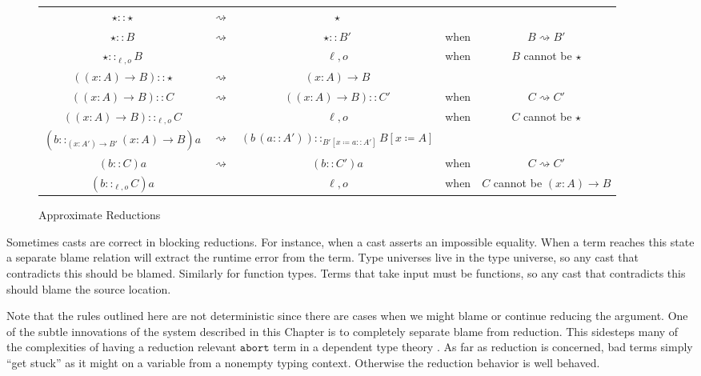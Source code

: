 \begin{sidewaysfigure}
\begin{tabular}{ccccc}
$\star::\star$ & $\rightsquigarrow$ & $\star$ &  & \tabularnewline
$\star::B$ & $\rightsquigarrow$ & $\star::B'$ & when  & $B\rightsquigarrow B'$\tabularnewline
$\star::_{\ell,o}B$ & \Blame{} & $\ell,o$ & when  & $B$ cannot be $\star$ \tabularnewline
$\left(\left(x:A\right)\rightarrow B\right)::\star$ & $\rightsquigarrow$ & $\left(x:A\right)\rightarrow B$ &  & \tabularnewline
$\left(\left(x:A\right)\rightarrow B\right)::C$ & $\rightsquigarrow$ & $\left(\left(x:A\right)\rightarrow B\right)::C'$ & when  & $C\rightsquigarrow C'$\tabularnewline
$\left(\left(x:A\right)\rightarrow B\right)::_{\ell,o}C$ & \Blame{} & $\ell,o$ & when  & $C$ cannot be $\star$ \tabularnewline
$\left(b::_{\left(x:A'\right)\rightarrow B'}\left(x:A\right)\rightarrow B\right)a$ & $\rightsquigarrow$ & $\left(b\,\left(a::A'\right)\right)::_{B'\left[x\coloneqq a::A'\right]}B\left[x\coloneqq A\right]$ &  & \tabularnewline
$\left(b::C\right)a$ & $\rightsquigarrow$ & $\left(b::C'\right)a$ & when  & $C\rightsquigarrow C'$\tabularnewline
$\left(b::_{\ell,o}C\right)a$ & \Blame{} & $\ell,o$ & when  & $C$ cannot be $\left(x:A\right)\rightarrow B$ \tabularnewline
\end{tabular}

\caption{Approximate \CLang{} Reductions}
\label{fig:cast-aprox-red}
\end{sidewaysfigure}
Sometimes casts are correct in blocking reductions.
For instance, when a cast asserts an impossible equality.
When a term reaches this state a separate blame relation will extract the runtime error from the term.
Type universes live in the type universe, so any cast that contradicts this should be blamed.
Similarly for function types.
Terms that take input must be functions, so any cast that contradicts this should blame the source location.

Note that the rules outlined here are not deterministic since there are cases when we might blame or continue reducing the argument.
One of the subtle innovations of the system described in this Chapter is to completely separate blame from reduction.
This sidesteps many of the complexities of having a reduction relevant $\mathtt{abort}$ term in a dependent type theory \cite{sjoberg2012irrelevance,pedrot2018failure}.
As far as reduction is concerned, bad terms simply ``get stuck'' as it might on a variable from a nonempty typing context.
Otherwise the reduction behavior is well behaved.

